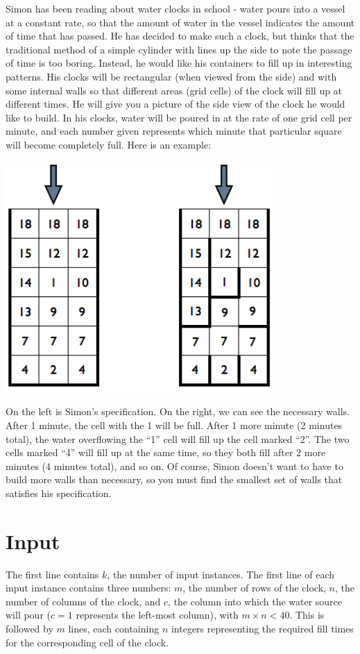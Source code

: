 
Simon has been reading about water clocks in school - water pours into
a vessel at a constant rate, so that the amount of water in the vessel
indicates the amount of time that has passed.  He has decided to make
such a clock, but thinks that the traditional method of a simple
cylinder with lines up the side to note the passage of time is too
boring.  Instead, he would like his containers to fill up in
interesting patterns.  His clocks will be rectangular (when viewed
from the side) and with some internal walls so that different areas
(grid cells) of the clock will fill up at different times.  He will
give you a picture of the side view of the clock he would like to
build.  In his clocks, water will be poured in at the rate of one grid
cell per minute, and each number given represents which minute that
particular square will become completely full.  Here is an example:

\begin{center}
\includegraphics[width=4in]{water-example.png}
\end{center}

On the left is Simon's specification.  On the right, we can see the
necessary walls.  After 1 minute, the cell with the 1 will be full.
After 1 more minute (2 minutes total), the water overflowing the ``1''
cell will fill up the cell marked ``2''.  The two cells marked ``4''
will fill up at the same time, so they both fill after 2 more minutes
(4 minutes total), and so on.  Of course, Simon doesn't want to have
to build more walls than necessary, so you must find the smallest
set of walls that satisfies his specification.

\section*{Input}
  The first line contains $k$, the number of input instances.  The
  first line of each input instance contains three numbers: $m$, the
  number of rows of the clock, $n$, the number of columns of the
  clock, and $c$, the column into which the water source will pour
  ($c=1$ represents the left-most column), with $m\times n < 40$.
  This is followed by $m$ lines, each containing $n$ integers
  representing the required fill times for the corresponding cell of
  the clock.

